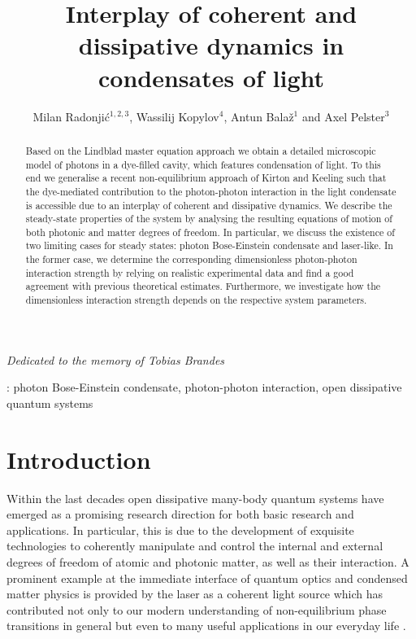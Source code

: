 \documentclass[12pt, a4paper]{iopart}
\begin{document}
{\it \hfill Dedicated to the memory of Tobias Brandes}

\title{Interplay of coherent and dissipative dynamics in condensates of light}

\author{Milan Radonji\'{c}$^{1,2,3}$, Wassilij Kopylov$^4$, Antun Bala\v{z}$^1$ and Axel Pelster$^3$}
\address{$^1$Scientific Computing Laboratory, Center for the Study of Complex Systems, Institute of Physics Belgrade,
University of Belgrade, Serbia\\
$^2$Faculty of Physics, University of Vienna, Austria\\
$^3$Physics Department and Research Center OPTIMAS, Technische Universit\"at Kaiserslautern, Germany\\
$^4$Institute for Theoretical Physics, Technische Universit\"at Berlin, Germany}

\begin{abstract}
Based on the Lindblad master equation approach we obtain a detailed microscopic model of photons in a dye-filled cavity, which features condensation of light. To this end we generalise a recent non-equilibrium approach of Kirton and Keeling such that the dye-mediated contribution to the photon-photon interaction in the light condensate is accessible due to an interplay of coherent and dissipative dynamics. We describe the steady-state properties of the system by analysing the resulting equations of motion of both photonic and matter degrees of freedom. In particular, we discuss the existence of two limiting cases for steady states: photon Bose-Einstein condensate and laser-like. In the former case, we determine the corresponding dimensionless photon-photon interaction strength by relying on realistic experimental data and find a good agreement with previous theoretical estimates. Furthermore, we investigate how the dimensionless interaction strength depends on the respective system parameters.
\end{abstract}

: photon Bose-Einstein condensate, photon-photon interaction, open dissipative quantum systems

\section{Introduction}
\label{sec:intro}

Within the last decades open dissipative many-body quantum systems have emerged as a promising research direction for both basic research and applications. In particular, this is due to the development of exquisite technologies to coherently manipulate and control the internal and external degrees of freedom of atomic and photonic matter, as well as their interaction. A prominent example at the immediate interface of quantum optics and condensed matter physics is provided by the laser as a coherent light source which has contributed not only to our modern understanding of non-equilibrium phase transitions in general but even to many useful applications in our everyday life \cite{Haken,Scully,Siegman,Meschede}. 
\end{document}
